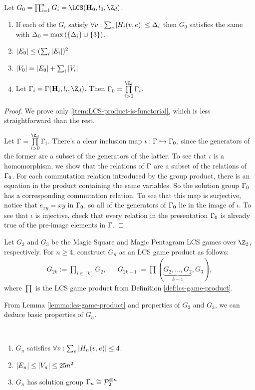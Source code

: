 \begin{lemma}
\label{lemma:lcs-game-product}
Let $G_0 = \prod_{i=1}^nG_i = \LCS(\mathbf H_0, l_0, \Z_d)$.
~\begin{enumerate}
	\item If each of the $G_i$ satisfy 
	$\forall v:\sum_e\left\vert H_i(v,e)\right\vert \leq \Delta_i$ then $G_0$ satisfies the same with
	$\Delta_0 = \max\left(\left\{\Delta_i\right\}\cup\left\{3\right\}\right)$.
	\item $\left\vert E_0\right\vert \leq (\sum_i\left\vert E_i\right\vert)^2$
	\item $\left\vert V_0\right\vert = \left\vert E_0\right\vert + \sum_i \left\vert V_i\right\vert$
	\item\label{item:LCS-product-is-functorial} Let $\G_i = \G(\mathbf H_i,l_i,\Z_d)$. Then $\G_0 = \prod\limits^{\Z_d}_{i>0}\G_i$. 
\end{enumerate}
\end{lemma}
\begin{proof}
	We prove only \eqref{item:LCS-product-is-functorial}, which is less straightforward than the rest.

	Let $\G = \prod\limits_{i>0}^{\Z_d}\G_i$. There's a clear inclusion map $\iota:\Gamma\hookrightarrow \Gamma_0$, since the generators of the former are a subset of the generators of the latter.  To see that $\iota$ is a homomorphism, we show that the relations of $\Gamma$ are a subset of the relations of $\Gamma_0$. For each commutation relation introduced by the group product, there is an equation in the product containing the same variables. So the solution group $\Gamma_0$ has a corresponding commutation relation.
	To see that this map is surjective, notice that $e_{xy} = xy$ in $\Gamma_0$, so all of the generators of $\Gamma_0$ lie in the image of $\iota$. To see that $\iota$ is injective, check that every relation in the presentation $\Gamma_0$ is already true of the pre-image elements in $\Gamma$. 
\end{proof}

\begin{definition}
	Let $G_2$ and $G_3$ be the Magic Square and Magic Pentagram LCS games over $\Z_2$, respectively.
	For $n\geq 4$, construct $G_n$ as an LCS game product as follows:
	\begin{align}
		G_{2k} := \prod_{i\in [k]}G_2,
		&&
		G_{2k+1} :=\prod(\underbrace{G_2,\ldots, G_2}_{k-1}, G_3),
	\end{align}
	where $\prod$ is the LCS game product from Definition \ref{def:lcs-game-product}. 
\end{definition}
From Lemma \ref{lemma:lcs-game-product} and properties of $G_2$ and $G_3$, we can deduce basic properties of $G_n$.
\begin{lemma}~
\label{lemma:basic-Gn-properties}
	\begin{enumerate}
		\item $G_n$ satisfies $\forall v:\sum_e \left\vert H_n(v,e)\right\vert \leq 4$.
		\item $\left\vert E_n\right\vert \leq \left\vert V_n\right\vert \leq 25n^2$.
		\item $G_n$ has solution group $\Gamma_n \cong \mathcal P_2^{\otimes n}$
	\end{enumerate}
\end{lemma}

